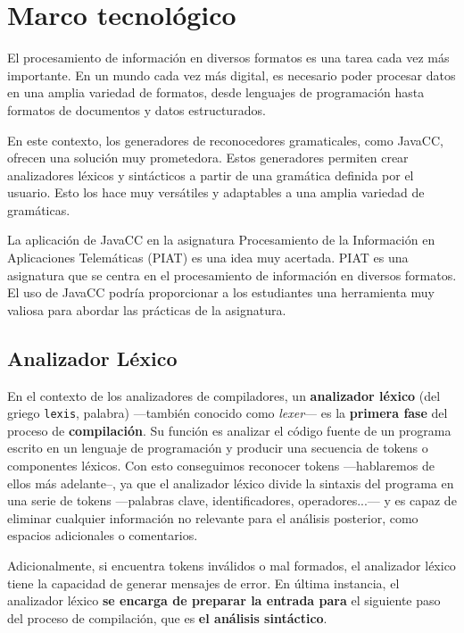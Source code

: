\section{Marco tecnológico}

\noindent El procesamiento de información en diversos formatos es una tarea cada vez más importante. En un mundo cada vez más digital, es necesario poder procesar datos en una amplia variedad de formatos, desde lenguajes de programación hasta formatos de documentos y datos estructurados.

En este contexto, los generadores de reconocedores gramaticales, como JavaCC, ofrecen una solución muy prometedora. Estos generadores permiten crear analizadores léxicos y sintácticos a partir de una gramática definida por el usuario. Esto los hace muy versátiles y adaptables a una amplia variedad de gramáticas.

La aplicación de JavaCC en la asignatura Procesamiento de la Información en Aplicaciones Telemáticas (PIAT) es una idea muy acertada. PIAT es una asignatura que se centra en el procesamiento de información en diversos formatos. El uso de JavaCC podría proporcionar a los estudiantes una herramienta muy valiosa para abordar las prácticas de la asignatura.

\subsection{Analizador Léxico}

\noindent En el contexto de los analizadores de compiladores, un \textbf{analizador léxico} (del griego \lstinline|lexis|, palabra) ---también conocido como \textit{lexer}--- es la \textbf{primera fase} del proceso de \textbf{compilación}. Su función es analizar el código fuente de un programa escrito en un lenguaje de programación y producir una secuencia de tokens o componentes léxicos\cite{lexer}. Con esto conseguimos reconocer tokens ---hablaremos de ellos más adelante--, ya que el analizador léxico divide la sintaxis del programa en una serie de tokens ---palabras clave, identificadores, operadores...--- y es capaz de eliminar cualquier información no relevante para el análisis posterior, como espacios adicionales o comentarios. 

Adicionalmente, si encuentra tokens inválidos o mal formados, el analizador léxico tiene la capacidad de generar mensajes de error. En última instancia, el analizador léxico \textbf{se encarga de preparar la entrada para} el siguiente paso del proceso de compilación, que es \textbf{el análisis sintáctico}.

